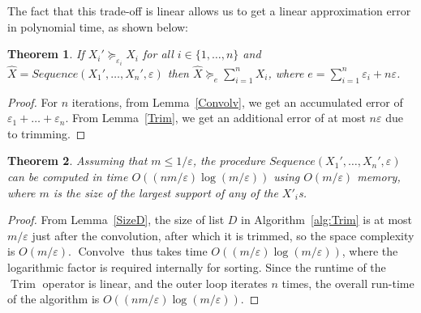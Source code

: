 \documentclass{article}
\newtheorem{theorem}{Theorem}
\DeclareMathOperator{\Trim}{Trim}
\begin{document}
The fact that this trade-off is linear allows us to get a linear approximation error 
in polynomial time, as shown below:



\begin{theorem}
If $X_i' \succeq_{\varepsilon_i} X_i$ for all $i \in\{1,\dots,n\}$ and $\hat{X}= Sequence(X_1',\dots,X_n', \varepsilon)$ then
$\hat{X} \succeq_e \sum_{i=1}^{n} X_{i}$, where $e={\sum_{i=1}^n\varepsilon_i + n \varepsilon}$. 
\label{appSeqTheorem}
\end{theorem} 

\begin{proof} For $n$ iterations, from Lemma~\ref{Convolv}, we get an accumulated error of 
$\varepsilon_1 +\dots+ \varepsilon_n$. From Lemma~\ref{Trim}, we get an additional error of at most $n\varepsilon$ due to trimming. 
\end{proof}


\begin{theorem} \label{appSeqComplexTheorem}
Assuming that $m \leq 1/\varepsilon$, the procedure
$Sequence(X_1',\dots,X_n', \varepsilon)$ can be computed
in time $O((nm/\varepsilon)\log(m/\varepsilon))$ using $O(m/\varepsilon)$ memory, where $m$ is the size of the largest support of any of the $X'_i$s.
\end{theorem} 

\begin{proof}
From Lemma~\ref{SizeD}, the size of list $D$ in Algorithm~\ref{alg:Trim} is at most $m/\varepsilon$
just after the convolution, after which it is trimmed, so the space complexity is $O(m/\varepsilon)$.
$\operatorname{Convolve}$ thus takes time $O((m/\varepsilon)\log(m/\varepsilon))$, where the logarithmic factor
is required internally
for sorting. Since the runtime of  the $\Trim$ operator is linear, and the
outer loop iterates $n$ times, the overall 
run-time of the algorithm is $O((n m/\varepsilon) \log(m/\varepsilon))$.
\end{proof}
\end{document}
